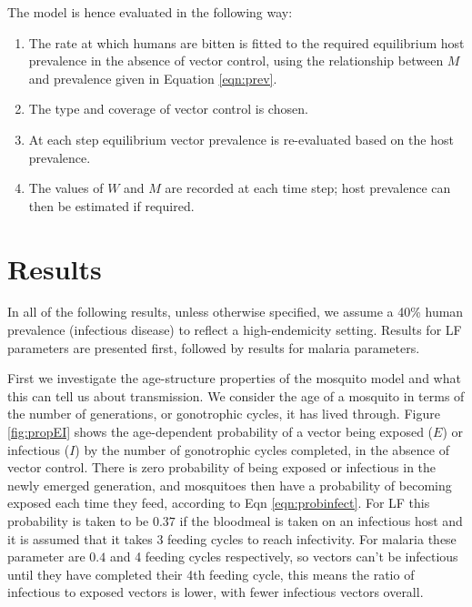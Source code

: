 The model is hence evaluated in the following way:
\begin{enumerate}
\item The rate at which humans are bitten is fitted to the required equilibrium host prevalence in the absence of vector control, using the relationship between $M$ and prevalence given in Equation \ref{eqn:prev}.
\item The type and coverage of vector control is chosen.
\item At each step equilibrium vector prevalence is re-evaluated based on the host prevalence. 
\item The values of $W$ and $M$ are recorded at each time step; host prevalence can then be estimated if required.
\end{enumerate}

\section{Results}

In all of the following results, unless otherwise specified, we assume a 40\% human prevalence (infectious disease) to reflect a high-endemicity setting. Results for LF parameters are presented first, followed by results for malaria parameters. 

First we investigate the age-structure properties of the mosquito model and what this can tell us about transmission. We consider the age of a mosquito in terms of the number of generations, or gonotrophic cycles, it has lived through. Figure \ref{fig:propEI} shows the age-dependent probability of a vector being exposed ($E$) or infectious ($I$) by the number of gonotrophic cycles completed, in the absence of vector control. There is zero probability of being exposed or infectious in the newly emerged generation, and mosquitoes then have a probability of becoming exposed each time they feed, according to Eqn \ref{eqn:probinfect}. For LF this probability is taken to be $0.37$ if the bloodmeal is taken on an infectious host and it is assumed that it takes 3 feeding cycles to reach infectivity. For malaria these parameter are $0.4$ and 4 feeding cycles respectively, so vectors can't be infectious until they have completed their 4th feeding cycle, this means the ratio of infectious to exposed vectors is lower, with fewer infectious vectors overall. 

